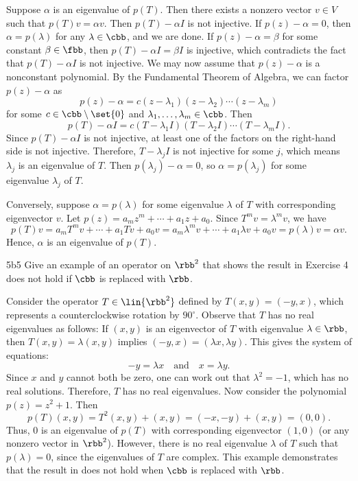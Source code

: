 \begin{sol}
    Suppose $\alpha$ is an eigenvalue of $p(T)$.
	Then there exists a nonzero vector $v \in V$ such that $p(T)v = \alpha v$.
	Then $p(T) - \alpha I$ is not injective.
    If $p(z) - \alpha = 0$, then $\alpha = p(\lambda)$ for any $\lambda \in \cbb$, and we are done.
    If $p(z) - \alpha = \beta$ for some constant $\beta \in \fbb$, then $p(T) - \alpha I = \beta I$ is injective, which contradicts the fact that $p(T) - \alpha I$ is not injective.
    We may now assume that $p(z) - \alpha$ is a nonconstant polynomial.
	By the Fundamental Theorem of Algebra, we can factor $p(z) - \alpha$ as
    \[
    	p(z) - \alpha = c(z - \lambda_1)(z - \lambda_2) \cdots (z - \lambda_m)
    \]
    for some $c \in \cbb \setminus \set{0}$ and $\lambda_1, \ldots, \lambda_m \in \cbb$.
	Then
    \[
    	p(T) - \alpha I = c(T - \lambda_1 I)(T - \lambda_2 I) \cdots (T - \lambda_m I).
    \]
    Since $p(T) - \alpha I$ is not injective, at least one of the factors on the right-hand side is not injective.
	Therefore, $T - \lambda_j I$ is not injective for some $j$, which means $\lambda_j$ is an eigenvalue of $T$.
	Then $p(\lambda_j) - \alpha = 0$, so $\alpha = p(\lambda_j)$ for some eigenvalue $\lambda_j$ of $T$.
    
    Conversely, suppose $\alpha = p(\lambda)$ for some eigenvalue $\lambda$ of $T$ with corresponding eigenvector $v$. Let $p(z) = a_m z^m + \cdots + a_1 z + a_0$. Since $T^m v = \lambda^m v$, we have
    \[
    	p(T)v = a_m T^m v + \cdots + a_1 T v + a_0 v = a_m \lambda^m v + \cdots + a_1 \lambda v + a_0 v = p(\lambda)v = \alpha v.
    \]
    Hence, $\alpha$ is an eigenvalue of $p(T)$.
\end{sol}

\begin{exercise}{5b5}
    Give an example of an operator on $\rbb^2$ that shows the result in Exercise 4 does not hold if $\cbb$ is replaced with $\rbb$.
\end{exercise}

\begin{sol}
    Consider the operator $T \in \lin{\rbb^2}$ defined by $T(x, y) = (-y, x)$, which represents a counterclockwise rotation by $90^\circ$.
	Observe that $T$ has no real eigenvalues as follows: If $(x, y)$ is an eigenvector of $T$ with eigenvalue $\lambda \in \rbb$, then $T(x, y) = \lambda (x, y)$ implies $(-y, x) = (\lambda x, \lambda y)$.
	This gives the system of equations:
    \[
    	-y = \lambda x \quad \text{and} \quad x = \lambda y.
    \]
    Since $x$ and $y$ cannot both be zero, one can work out that $\lambda^2 = -1$, which has no real solutions.
	Therefore, $T$ has no real eigenvalues.
	Now consider the polynomial $p(z) = z^2 + 1$.
	Then
    \[
    	p(T)(x, y) = T^2(x, y) + (x, y) = (-x, -y) + (x, y) = (0, 0).
    \]
    Thus, $0$ is an eigenvalue of $p(T)$ with corresponding eigenvector $(1, 0)$ (or any nonzero vector in $\rbb^2$).
	However, there is no real eigenvalue $\lambda$ of $T$ such that $p(\lambda) = 0$, since the eigenvalues of $T$ are complex.
	This example demonstrates that the result in  does not hold when $\cbb$ is replaced with $\rbb$.
\end{sol}

